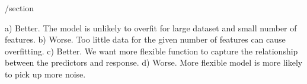 /section{}

a) Better. The model is unlikely to overfit for large dataset and small number of features.
b) Worse. Too little data for the given number of features can cause overfitting.
c) Better. We want more flexible function to capture the relationship between the predictors and response.
d) Worse. More flexible model is more likely to pick up more noise.